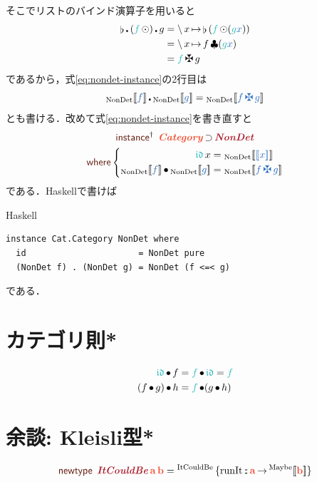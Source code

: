 \documentclass[a5paper,twoside,fleqn,draft]{jsbook}
\def\[{[\![}
\def\]{]\!]}
\def\keywordColor{Sepia}
\def\varColor{NavyBlue}
\def\funcColor{BlueGreen}
\def\typeColor{RedOrange}
\def\typeConstColor{Maroon}
\newcommand{\programminglanguage}[1]{\textsf{#1}}
\newcommand{\haskell}{\programminglanguage{Haskell}}
\newenvironment{haskellcode}{\begin{itembox}[r]{\haskell}}{\end{itembox}}
\newcommand{\mKeyword}[1]{\textcolor{\keywordColor}{\mathsf{#1}}}
\newcommand{\mInstanceDeclKeyword}{\mKeyword{instance}}
\newcommand{\mNewTypeDeclKeyword}{\mKeyword{newtype}}
\newcommand{\mWhereKeyword}{\mKeyword{where}}
\newcommand{\mPolymorphic}[1]{{#1}^\dagger}
\newcommand{\mTypeConstructor}[1]{\textcolor{\typeConstColor}{\textbf{\textit{#1}}}}
\DeclareMathOperator{\mInstanceDeclPolymorphic}{\mPolymorphic{\mInstanceDeclKeyword}}
\DeclareMathOperator{\mNewTypeDecl}{\mNewTypeDeclKeyword}
\DeclareMathOperator{\mSuperSet}{\supset}
\DeclareMathOperator{\mWhere}{\mWhereKeyword}
\newcommand{\mVar}[1]{\textcolor{\varColor}{#1}}
\newcommand{\mXVar}{\mVar{x}}
\newcommand{\mFunc}[1]{\textcolor{\funcColor}{#1}}
\newcommand{\mVarSpecialFunc}[1]{\textcolor{\funcColor}{\mathfrak{#1}}}
\newcommand{\mFFunc}{{\mFunc{f}}}
\newcommand{\mGFunc}{\mFunc{g}}
\DeclareMathOperator{\mIdCat}{\mVarSpecialFunc{id}}
\DeclareMathOperator{\mBindComp}{\maltese}
\DeclareMathOperator{\mBindList}{\clubsuit}
\DeclareMathOperator{\mCompFunc}{\centerdot}
\DeclareMathOperator{\mCompCat}{\bullet}
\DeclareMathOperator{\mFuncArrow}{\rightarrow}
\DeclareMathOperator{\mIn}{{:\!:}}
\DeclareMathOperator{\mJoinList}{\flat} %
\DeclareMathOperator{\mLambda}{\backslash}
\DeclareMathOperator{\mLambdaArrow}{\mapsto}
\DeclareMathOperator{\mMapList}{\odot}
\newcommand{\mType}[1]{\textcolor{\typeColor}{\mathbf{#1}}}
\newcommand{\mA}{\mType{a}}
\newcommand{\mB}{\mType{b}}
\newcommand{\mTypeAssemble}[2]{{}^\mathrm{#1}\[\mType{#2}\]}
\newcommand{\mMaybeType}[1]{\mTypeAssemble{Maybe}{#1}}
\newcommand{\mValueConstructor}[1]{\mathrm{#1}}
\newcommand{\mValueWith}[2]{{}_\mValueConstructor{#1}\[\mVar{#2}\]}
\newcommand{\mValueRecordBeginWith}[1]{{}^\mValueConstructor{#1}\,\{}
\newcommand{\mValueRecordEnd}{\}}
\newcommand{\mValueRecordWith}[2]{\mValueRecordBeginWith{#1}{#2}\mValueRecordEnd}
\newcommand{\mPureWith}[1]{\[\mVar{#1}\]}
\newcommand{\mTypeClass}[1]{\textcolor{\typeColor}{\textbf{\textit{#1}}}}
\newcommand{\mCatTypeClass}{\mTypeClass{Category}}
\begin{document}
そこでリストのバインド演算子を用いると
\begin{align}
  \mJoinList\mCompFunc{}(\mFFunc\mMapList)\mCompFunc g
  &=\mLambda x\mLambdaArrow\mJoinList{}(\mFFunc\mMapList(\mGFunc\mXVar))\\
  &=\mLambda x\mLambdaArrow f\mBindList(\mGFunc\mXVar)\\
  &=\mFFunc\mBindComp g
\end{align}
であるから，式\eqref{eq:nondet-instance}の2行目は
\begin{equation}
  \mValueWith{NonDet}{f}\mCompFunc\mValueWith{NonDet}{g}
  =\mValueWith{NonDet}{f\mBindComp g}
\end{equation}
とも書ける．改めて式\eqref{eq:nondet-instance}を書き直すと
\begin{multline}
  \mInstanceDeclPolymorphic\;
  \mCatTypeClass\mSuperSet\mTypeConstructor{NonDet}\\
  \mWhere\left\{
  \begin{aligned}
    \mIdCat x
    &=\mValueWith{NonDet}{\mPureWith{x}}\\ %
    \mValueWith{NonDet}{f}\mCompCat\mValueWith{NonDet}{g}
    &=\mValueWith{NonDet}{f\mBindComp g}
  \end{aligned}
  \right.
\end{multline}
である．\haskell で書けば
\begin{haskellcode}
\begin{verbatim}
instance Cat.Category NonDet where
  id                      = NonDet pure
  (NonDet f) . (NonDet g) = NonDet (f <=< g)
\end{verbatim}
\end{haskellcode}
である．

\section{カテゴリ則*}

\begin{align}
\mIdCat\mCompCat f&=\mFFunc\mCompCat\mIdCat=\mFFunc\\
(f\mCompCat g)\mCompCat h&=\mFFunc\mCompCat(g\mCompCat h)
\end{align}

\section{余談: Kleisli型*}

\begin{equation}
  \mNewTypeDecl\;
  \mTypeConstructor{ItCouldBe}\,\mA\,\mB
  =\mValueRecordWith{ItCouldBe}{\mathrm{runIt}\mIn\mA\mFuncArrow\mMaybeType{b}}
\end{equation}
\end{document}
